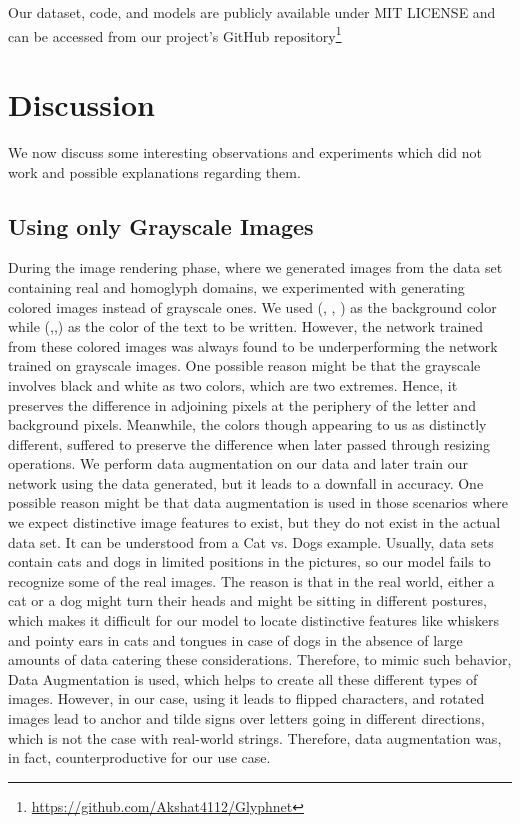 \documentclass[letterpaper]{article} \usepackage{aaai22}  \usepackage{times}  \usepackage{helvet}  \usepackage{courier}  \usepackage[hyphens]{url}  \usepackage{graphicx} \urlstyle{rm} \def\UrlFont{\rm}  \usepackage{natbib}  \usepackage{caption} \DeclareCaptionStyle{ruled}{labelfont=normalfont,labelsep=colon,strut=off} \frenchspacing  \setlength{\pdfpagewidth}{8.5in}  \setlength{\pdfpageheight}{11in}  \usepackage{algorithm}
\begin{document}
Our dataset, code, and models are publicly available under MIT LICENSE and can be accessed from our project's GitHub repository\footnote{\url{https://github.com/Akshat4112/Glyphnet}}

\section{Discussion}
We now discuss some interesting observations and experiments which did not work and possible explanations regarding them.

\subsection{Using only Grayscale Images}
During the image rendering phase, where we generated images from the data set containing real and homoglyph domains, we experimented with generating colored images instead of grayscale ones. We used (, , ) as the background color while (,,) as the color of the text to be written. However, the network trained from these colored images was always found to be underperforming the network trained on grayscale images. One possible reason might be that the grayscale involves black and white as two colors, which are two extremes. Hence, it preserves the difference in adjoining pixels at the periphery of the letter and background pixels.
Meanwhile, the colors though appearing to us as distinctly different, suffered to preserve the difference when later passed through resizing operations. We perform data augmentation on our data and later train our network using the data generated, but it leads to a downfall in accuracy. One possible reason might be that data augmentation\cite{shorten2019survey} is used in those scenarios where we expect distinctive image features to exist, but they do not exist in the actual data set. It can be understood from a Cat vs. Dogs example. Usually, data sets contain cats and dogs in limited positions in the pictures, so our model fails to recognize some of the real images. The reason is that in the real world, either a cat or a dog might turn their heads and might be sitting in different postures, which makes it difficult for our model to locate distinctive features like whiskers and pointy ears in cats and tongues in case of dogs in the absence of large amounts of data catering these considerations. Therefore, to mimic such behavior, Data Augmentation is used, which helps to create all these different types of images. However, in our case, using it leads to flipped characters, and rotated images lead to anchor and tilde signs over letters going in different directions, which is not the case with real-world strings. Therefore, data augmentation was, in fact, counterproductive for our use case.
\end{document}
